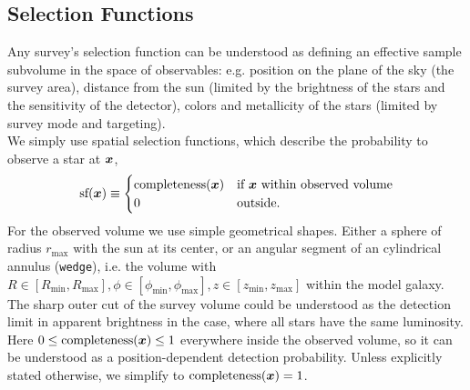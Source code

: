 

\subsection{Selection Functions} \label{sec:selectionfunction}

Any survey's selection function can be understood as defining an effective sample subvolume in the space of observables: e.g. position on the plane of the sky (the survey area), distance from the sun (limited by the brightness of the stars and the sensitivity of the detector), colors and metallicity of the stars (limited by survey mode and targeting).
\\We simply use spatial selection functions, which describe the probability to observe a star at $\boldsymbol{x}$,
\begin{eqnarray*}
\text{sf}(\boldsymbol{x}) \equiv \begin{cases}
\text{completeness}(\boldsymbol{x}) &\text{if $\boldsymbol{x}$ within observed volume}\\
0 & \text{outside.}
\end{cases}
\end{eqnarray*}
For the observed volume we use simple geometrical shapes. Either a sphere of radius $r_\text{max}$ with the sun at its center, or an angular segment of an cylindrical annulus (\texttt{wedge}), i.e. the volume with $R \in [R_\text{min},R_\text{max}],\phi \in [\phi_\text{min},\phi_\text{max}],z \in [z_\text{min},z_\text{max}]$ within the model galaxy. The sharp outer cut of the survey volume could be understood as the detection limit in apparent brightness in the case, where all stars have the same luminosity. Here $0 \leq \text{completeness}(\boldsymbol{x}) \leq 1$ everywhere inside the observed volume, so it can be understood as a position-dependent detection probability. Unless explicitly stated otherwise, we simplify to $\text{completeness}(\boldsymbol{x}) = 1$.